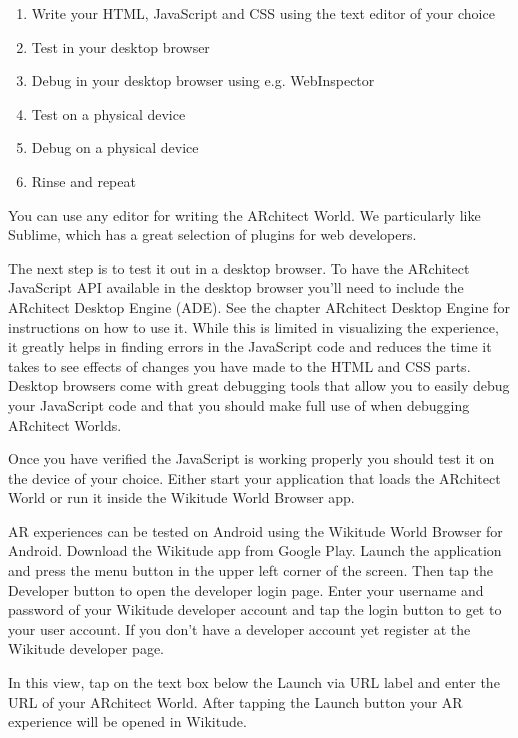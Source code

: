 \documentclass{article}
\begin{document}
\begin{enumerate}
\item Write your HTML, JavaScript and CSS using the text editor of your choice 
\item Test in your desktop browser 
\item Debug in your desktop browser using e.g. WebInspector
\item Test on a physical device
\item Debug on a physical device
\item Rinse and repeat 
\end{enumerate}
\par You can use any editor for writing the ARchitect World. We particularly like Sublime, which has a great selection of plugins for web developers.
\par The next step is to test it out in a desktop browser. To have the ARchitect JavaScript API available in the desktop browser you'll need to include the ARchitect Desktop Engine (ADE). See the chapter ARchitect Desktop Engine for instructions on how to use it. While this is limited in visualizing the experience, it greatly helps in finding errors in the JavaScript code and reduces the time it takes to see effects of changes you have made to the HTML and CSS parts. Desktop browsers come with great debugging tools that allow you to easily debug your JavaScript code and that you should make full use of when debugging ARchitect Worlds. 
\par Once you have verified the JavaScript is working properly you should test it on the device of your choice. Either start your application that loads the ARchitect World or run it inside the Wikitude World Browser app. 
\par AR experiences can be tested on Android using the Wikitude World Browser for Android. Download the Wikitude app from Google Play. Launch the application and press the menu button in the upper left corner of the screen. Then tap the Developer button to open the developer login page. Enter your username and password of your Wikitude developer account and tap the login button to get to your user account. If you don't have a developer account yet register at the Wikitude developer page.
\par In this view, tap on the text box below the Launch via URL label and enter the URL of your ARchitect World. After tapping the Launch button your AR experience will be opened in Wikitude. \\
\end{document}
